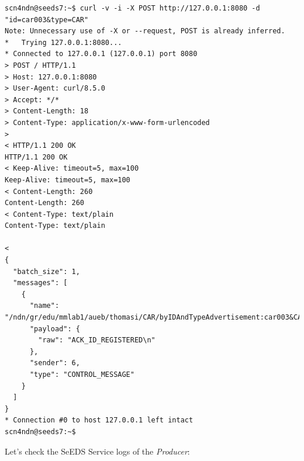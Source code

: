 \documentclass{article}
\begin{document}
\begin{lstlisting}[language=curl, caption={Publish to Producer's registry through \emph{MMLab2}}, label={lst:publish-registry-other-node}]
scn4ndn@seeds7:~$ curl -v -i -X POST http://127.0.0.1:8080 -d "id=car003&type=CAR"
Note: Unnecessary use of -X or --request, POST is already inferred.
*   Trying 127.0.0.1:8080...
* Connected to 127.0.0.1 (127.0.0.1) port 8080
> POST / HTTP/1.1
> Host: 127.0.0.1:8080
> User-Agent: curl/8.5.0
> Accept: */*
> Content-Length: 18
> Content-Type: application/x-www-form-urlencoded
> 
< HTTP/1.1 200 OK
HTTP/1.1 200 OK
< Keep-Alive: timeout=5, max=100
Keep-Alive: timeout=5, max=100
< Content-Length: 260
Content-Length: 260
< Content-Type: text/plain
Content-Type: text/plain

< 
{
  "batch_size": 1,
  "messages": [
    {
      "name": "/ndn/gr/edu/mmlab1/aueb/thomasi/CAR/byIDAndTypeAdvertisement:car003&CAR",
      "payload": {
        "raw": "ACK_ID_REGISTERED\n"
      },
      "sender": 6,
      "type": "CONTROL_MESSAGE"
    }
  ]
}
* Connection #0 to host 127.0.0.1 left intact
scn4ndn@seeds7:~$ 
\end{lstlisting}

Let's check the SeEDS Service logs of the \emph{Producer}:
\end{document}
